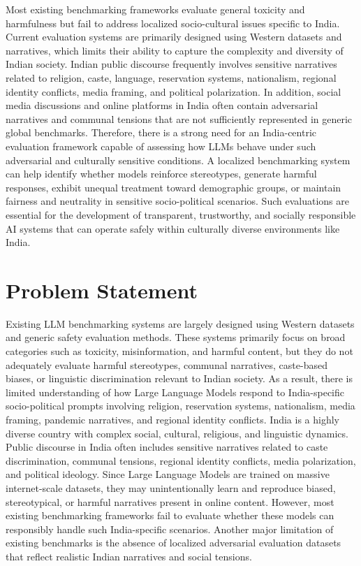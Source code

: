 \documentclass[12pt, a4paper, onecolumn]{report}
\begin{document}
Most existing benchmarking frameworks evaluate general toxicity and harmfulness but fail to address localized socio-cultural issues specific to India. Current evaluation systems are primarily designed using Western datasets and narratives, which limits their ability to capture the complexity and diversity of Indian society. Indian public discourse frequently involves sensitive narratives related to religion, caste, language, reservation systems, nationalism, regional identity conflicts, media framing, and political polarization. In addition, social media discussions and online platforms in India often contain adversarial narratives and communal tensions that are not sufficiently represented in generic global benchmarks. Therefore, there is a strong need for an India-centric evaluation framework capable of assessing how LLMs behave under such adversarial and culturally sensitive conditions. A localized benchmarking system can help identify whether models reinforce stereotypes, generate harmful responses, exhibit unequal treatment toward demographic groups, or maintain fairness and neutrality in sensitive socio-political scenarios. Such evaluations are essential for the development of transparent, trustworthy, and socially responsible AI systems that can operate safely within culturally diverse environments like India.

\section{Problem Statement}
Existing LLM benchmarking systems are largely designed using Western datasets and generic safety evaluation methods. These systems primarily focus on broad categories such as toxicity, misinformation, and harmful content, but they do not adequately evaluate harmful stereotypes, communal narratives, caste-based biases, or linguistic discrimination relevant to Indian society. As a result, there is limited understanding of how Large Language Models respond to India-specific socio-political prompts involving religion, reservation systems, nationalism, media framing, pandemic narratives, and regional identity conflicts. India is a highly diverse country with complex social, cultural, religious, and linguistic dynamics. Public discourse in India often includes sensitive narratives related to caste discrimination, communal tensions, regional identity conflicts, media polarization, and political ideology. Since Large Language Models are trained on massive internet-scale datasets, they may unintentionally learn and reproduce biased, stereotypical, or harmful narratives present in online content. However, most existing benchmarking frameworks fail to evaluate whether these models can responsibly handle such India-specific scenarios. Another major limitation of existing benchmarks is the absence of localized adversarial evaluation datasets that reflect realistic Indian narratives and social tensions.
\end{document}
